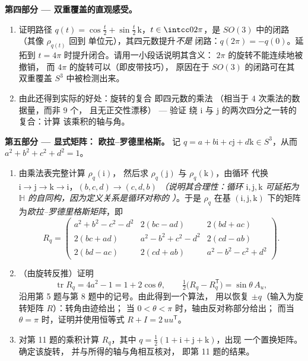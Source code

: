\begin{problem}
\medskip
\noindent\textbf{第四部分 --- 双重覆盖的直观感受。}
\begin{enumerate}[resume]
  \item 证明路径 $q(t) = \cos\frac t2 + \sin\frac
        t2\,\mathrm k$，$t \in \intcc0{2\pi}$，是 $SO(3)$ 中的闭路
        （其像 $\rho_{q(t)}$ 回到
        单位元），其四元数提升\emph{不是}
        闭路：$q(2\pi) = -q(0)$。延拓到 $t = 4\pi$
        时提升闭合。请用一小段话说明其含义：
        $2\pi$ 的旋转不能连续地被撤销，
        而 $4\pi$ 的旋转可以（即皮带技巧），
        原因在于 $SO(3)$ 的闭路可在其
        双重覆盖 $S^3$ 中被检测出来。
  \item 由此还得到实际的好处：旋转的复合
        即四元数的乘法
        （相当于 $4$ 次乘法的数据量，而非 $9$ 个，
        且无正交性漂移） --- 验证
        绕 $\mathrm i$ 与
        $\mathrm j$ 的两次四分之一转的复合：计算
        该乘积的轴与角。
\end{enumerate}

\medskip
\noindent\textbf{第五部分 --- 显式矩阵：}
\textbf{欧拉--罗德里格斯。} 记 $q = a + b\mathrm i + c\mathrm j +
d\mathrm k \in S^3$，从而 $a^2 + b^2 + c^2 + d^2 = 1$。
\begin{enumerate}[resume]
  \item 由乘法表完整计算 $\rho_q(\mathrm i)$，
        然后求 $\rho_q(\mathrm
        j)$ 与 $\rho_q(\mathrm k)$，由循环
        代换 $\mathrm i \to \mathrm j \to \mathrm k
        \to \mathrm i$，$(b, c, d) \to (c, d, b)$
        \emph{（说明其合理性：循环 $\mathrm i, \mathrm j,
        \mathrm k$ 可延拓为 $\mathbb
        H$ 的自同构，因为定义关系是循环对称的
        ）}。于是 $\rho_q$ 在基
        $(\mathrm i, \mathrm j, \mathrm k)$ 下的矩阵
        为\emph{欧拉--罗德里格斯矩阵}，即
        \[
        R_q = \begin{pmatrix}
        a^2 + b^2 - c^2 - d^2 & 2(bc - ad) & 2(bd + ac)\\
        2(bc + ad) & a^2 - b^2 + c^2 - d^2 & 2(cd - ab)\\
        2(bd - ac) & 2(cd + ab) & a^2 - b^2 - c^2 + d^2
        \end{pmatrix}.
        \]
  \item （由旋转反推）证明
        \[
        \operatorname{tr}R_q = 4a^2 - 1 = 1 + 2\cos\theta,
        \qquad
        \tfrac12\bigl(R_q - R_q^{\mathsf T}\bigr) =
        \sin\theta\,A_u,
        \]
        沿用第 5 题与第 8 题中的记号。由此得到一个算法，
        用以恢复 $\pm q$（输入为旋转矩阵
        $R$）：转角由迹给出；
        当 $0 < \theta < \pi$ 时，轴由反对称部分给出；
        而当 $\theta = \pi$ 时，证明并使用恒等式 $R
        + I = 2\,uu^{\mathsf T}$。
  \item 对第 11 题的乘积计算 $R_q$，其中 $q =
        \frac12(1 + \mathrm i + \mathrm j + \mathrm k)$，出现
        一个置换矩阵。确定该旋转，
        并与所得的轴与角相互核对，
        即第 11 题的结果。
\end{enumerate}


\end{problem}
